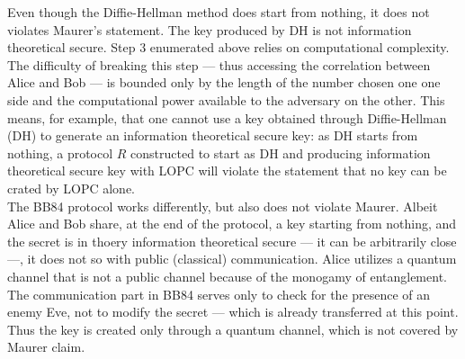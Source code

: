 	 Even though the Diffie-Hellman method does start from nothing, it does not violates Maurer's statement.
	 The key produced by DH is not information theoretical secure. 
	 Step $3$ enumerated above relies on computational complexity.
	 The difficulty of breaking this step --- thus accessing the correlation between Alice and Bob --- is bounded only by the length of the number chosen one one side and the computational power available to the adversary on the other.
	 This means, for example, that one cannot use a key obtained through Diffie-Hellman (DH) to generate an information theoretical secure key: 
	 as DH starts from nothing, a protocol $R$ constructed to start as DH and producing information theoretical secure key with LOPC will violate the statement that no key can be crated by LOPC alone.\\
	 The BB84 protocol works differently, but also does not violate Maurer.
	 Albeit Alice and Bob share, at the end of the protocol, a key starting from nothing, and the secret is in thoery information theoretical secure --- it can be arbitrarily close ---, it does not so with public (classical) communication.
	 Alice utilizes a quantum channel that is not a public channel because of the monogamy of entanglement.
	 The communication part in BB84 serves only to check for the presence of an enemy Eve, not to modify the secret --- which is already transferred at this point.  
	 Thus the key is created only through a quantum channel, which is not covered by Maurer claim.\\

%	
	 
